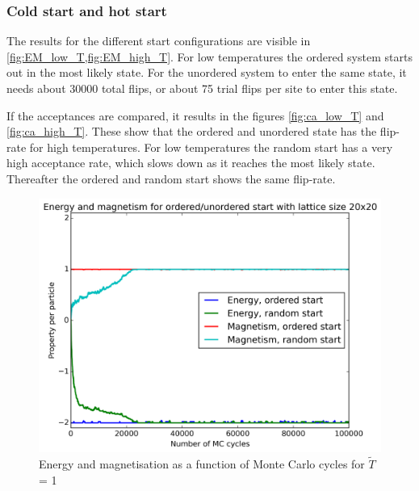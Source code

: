 \documentclass[11pt,a4paper,draft]{article}
\numberwithin{equation}{section}
\newcommand{\figurewidth}{.85\textwidth}
\begin{document}
\subsubsection{Cold start and hot start}

The results for the different start configurations are visible 
in \cref{fig:EM_low_T,fig:EM_high_T}. For low 
temperatures the ordered system starts out in the most likely state. For 
the unordered system to enter the same state, it needs about 30000 total 
flips, or about 75 trial flips per site to enter this state.

If the acceptances are compared, it 
results in the figures \ref{fig:ca_low_T} and \ref{fig:ca_high_T}.
These show that the ordered and unordered state has the flip-rate for 
high temperatures. For low temperatures the random start has a very high
acceptance rate, which slows down as it reaches the most likely state.
Thereafter the ordered and random start shows the same flip-rate.




\begin{figure}
\centering
\includegraphics[width=\figurewidth]{pics/cEM1.png}
\caption{Energy and magnetisation as a function of Monte Carlo cycles
for $\tilde{T}$ = 1}
\label{fig:EM_low_T}
\end{figure}
\end{document}

